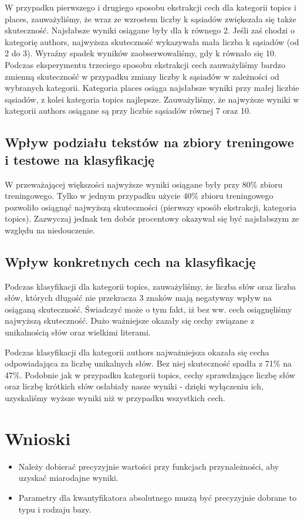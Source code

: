 \documentclass{classrep}
\begin{document}
W przypadku pierwszego i drugiego sposobu ekstrakcji cech dla kategorii topics i places, zauważyliśmy, że wraz ze wzrostem liczby k sąsiadów zwiększała się także skuteczność. Najsłabsze wyniki osiągane były dla k równego 2. Jeśli zaś chodzi o kategorię authors, najwyższa skuteczność wykazywała mała liczba k sąsiadów (od 2 do 3). Wyraźny spadek wyników zaobserwowaliśmy, gdy k równało się 10. Podczas eksperymentu trzeciego sposobu ekstrakcji cech zauważyliśmy bardzo zmienną skuteczność w przypadku zmiany liczby k sąsiadów w zależności od wybranych kategorii. Kategoria places osiąga najsłabsze wyniki przy małej liczbie sąsiadów, z kolei kategoria topics najlepsze. Zauważyliśmy, że najwyższe wyniki w kategorii authors osiągane są przy liczbie sąsiadów równej 7 oraz 10. 


\subsection{Wpływ podziału tekstów na zbiory treningowe i testowe na klasyfikację}
W przeważającej większości najwyższe wyniki osiągane były przy 80\% zbioru treningowego. Tylko w jednym przypadku użycie 40\% zbioru treningowego pozwoliło osiągnąć najwyższą skuteczności (pierwszy sposób ekstrakcji, kategoria topics). Zazwyczaj jednak ten dobór procentowy okazywał się być najsłabszym ze względu na niedouczenie. 
\newline

\subsection{Wpływ konkretnych cech na klasyfikację}
Podczas klasyfikacji dla kategorii topics, zauważyliśmy, że liczba słów oraz liczba słów, których długość nie przekracza 3 znaków mają negatywny wpływ na osiąganą skuteczność. Świadczyć może o tym fakt, iż bez ww. cech osiągnęliśmy najwyższą skuteczność. Dużo ważniejsze okazały się cechy związane z unikalnością słów oraz wielkimi literami. \newline

Podczas klasyfikacji dla kategorii authors najważniejsza okazała się cecha odpowiadająca za liczbę unikalnych słów. Bez niej skuteczność spadła z 71\% na 47\%. Podobnie jak w przypadku kategorii topics, cechy sprawdzające liczbę słów oraz liczbę krótkich słów osłabiały nasze wyniki - dzięki wyłączeniu ich, uzyskaliśmy wyższe wyniki niż w przypadku wszystkich cech. 

	
\section{Wnioski}
\begin{itemize}
	\item Należy dobierać precyzyjnie wartości przy funkcjach przynależności, aby uzyskać miarodajne wyniki.
	\item Parametry dla kwantyfikatora absolutnego muszą być precyzyjnie dobrane to typu i rodzaju bazy. 
\end{itemize}
\end{document}

